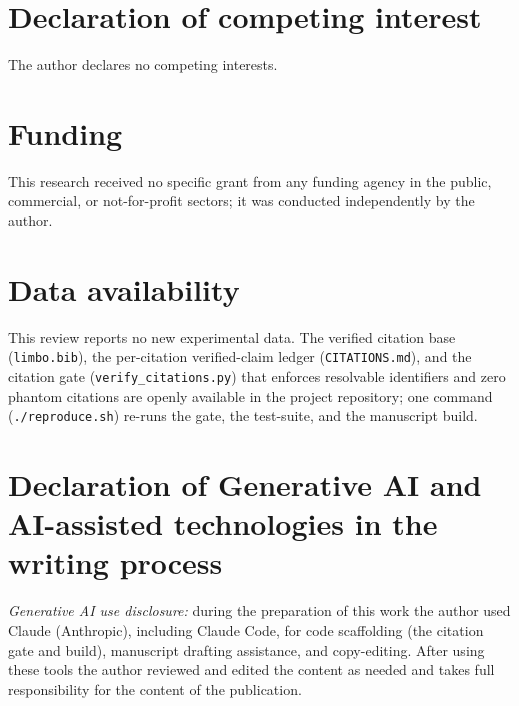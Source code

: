 \documentclass[review,number]{elsarticle}
\begin{document}
\section*{Declaration of competing interest}
The author declares no competing interests.

\section*{Funding}
This research received no specific grant from any funding agency in the public,
commercial, or not-for-profit sectors; it was conducted independently by the author.

\section*{Data availability}
This review reports no new experimental data. The verified citation base
(\texttt{limbo.bib}), the per-citation verified-claim ledger (\texttt{CITATIONS.md}), and
the citation gate (\texttt{verify\_citations.py}) that enforces resolvable identifiers and
zero phantom citations are openly available in the project repository; one command
(\texttt{./reproduce.sh}) re-runs the gate, the test-suite, and the manuscript build.

\section*{Declaration of Generative AI and AI-assisted technologies in the writing process}
\emph{Generative AI use disclosure:} during the preparation of this work the author used
Claude (Anthropic), including Claude Code, for code scaffolding (the citation gate and
build), manuscript drafting assistance, and copy-editing. After using these tools the
author reviewed and edited the content as needed and takes full responsibility for the
content of the publication.



\end{document}
